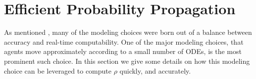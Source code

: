 \documentclass[conference]{IEEEtran}
\begin{document}
%


\section{Efficient Probability Propagation} \label{sec:efficient}
As mentioned , many of the modeling choices were born out of a balance between accuracy and real-time computability.
One of the major modeling choices, that agents move approximately according to a small number of ODEs, is the most prominent such choice.
In this section we give some details on how this modeling choice can be leveraged to compute $\rho$ quickly, and accurately.
\end{document}
